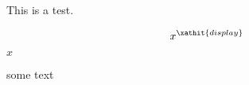 \documentclass{article}
\begin{document}
This is a test.

\[
x^\xathit{display}
\]

\begin{someenv}
$x$
\end{someenv}

some text
\end{document}
